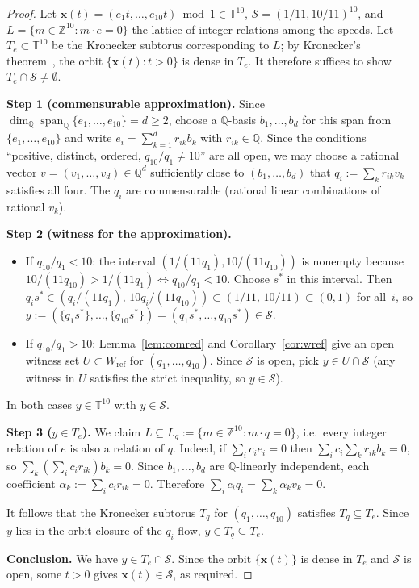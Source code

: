 \documentclass[12pt,a4paper]{amsart}
\theoremstyle{definition}
\theoremstyle{remark}
\newcommand{\Wref}{W_{\mathrm{ref}}}
\begin{document}
\begin{proof}
Let $\mathbf{x}(t)=(e_1t,\ldots,e_{10}t)\bmod 1\in\mathbb{T}^{10}$,
$\mathcal{S}=(1/11,10/11)^{10}$, and
$L=\{m\in\mathbb{Z}^{10}:m\cdot e=0\}$ the lattice of integer relations among the speeds.
Let $T_e\subset\mathbb{T}^{10}$ be the Kronecker subtorus corresponding to $L$; by
Kronecker's theorem~\cite{KN74}, the orbit $\{\mathbf{x}(t):t>0\}$ is dense in $T_e$.
It therefore suffices to show $T_e\cap\mathcal{S}\ne\emptyset$.

\medskip\noindent\textbf{Step 1 (commensurable approximation).}
Since $\dim_{\mathbb{Q}}\operatorname{span}_{\mathbb{Q}}\{e_1,\ldots,e_{10}\}=d\ge 2$,
choose a $\mathbb{Q}$-basis $b_1,\ldots,b_d$ for this span from $\{e_1,\ldots,e_{10}\}$
and write $e_i=\sum_{k=1}^d r_{ik}b_k$ with $r_{ik}\in\mathbb{Q}$.
Since the conditions ``positive, distinct, ordered, $q_{10}/q_1\ne 10$'' are all open,
we may choose a rational vector $v=(v_1,\ldots,v_d)\in\mathbb{Q}^d$ sufficiently close
to $(b_1,\ldots,b_d)$ that $q_i:=\sum_k r_{ik}v_k$ satisfies all four. The $q_i$ are
commensurable (rational linear combinations of rational $v_k$).

\medskip\noindent\textbf{Step 2 (witness for the approximation).}
\begin{itemize}
\item If $q_{10}/q_1<10$: the interval $(1/(11q_1),10/(11q_{10}))$ is nonempty because
  $10/(11q_{10})>1/(11q_1)\iff q_{10}/q_1<10$. Choose $s^*$ in this interval. Then
  $q_is^*\in(q_i/(11q_1),\,10q_i/(11q_{10}))\subset(1/11,\,10/11)\subset(0,1)$ for
  all~$i$, so $y:=(\{q_1s^*\},\ldots,\{q_{10}s^*\})=(q_1s^*,\ldots,q_{10}s^*)\in\mathcal{S}$.
\item If $q_{10}/q_1>10$: Lemma~\ref{lem:comred} and Corollary~\ref{cor:wref} give an
  open witness set $U\subset\Wref$ for $(q_1,\ldots,q_{10})$. Since $\mathcal{S}$ is open,
  pick $y\in U\cap\mathcal{S}$ (any witness in $U$ satisfies the strict inequality, so
  $y\in\mathcal{S}$).
\end{itemize}
In both cases $y\in\mathbb{T}^{10}$ with $y\in\mathcal{S}$.

\medskip\noindent\textbf{Step 3 ($y\in T_e$).}
We claim $L\subseteq L_q:=\{m\in\mathbb{Z}^{10}:m\cdot q=0\}$, i.e.\ every integer
relation of $e$ is also a relation of $q$. Indeed, if $\sum_i c_ie_i=0$ then
$\sum_i c_i\sum_k r_{ik}b_k=0$, so $\sum_k(\sum_i c_ir_{ik})b_k=0$. Since
$b_1,\ldots,b_d$ are $\mathbb{Q}$-linearly independent, each coefficient
$\alpha_k:=\sum_i c_ir_{ik}=0$. Therefore $\sum_i c_iq_i=\sum_k\alpha_kv_k=0$. \checkmark

It follows that the Kronecker subtorus $T_q$ for $(q_1,\ldots,q_{10})$ satisfies
$T_q\subseteq T_e$. Since $y$ lies in the orbit closure of the $q_i$-flow, $y\in T_q
\subseteq T_e$.

\medskip\noindent\textbf{Conclusion.}
We have $y\in T_e\cap\mathcal{S}$. Since the orbit $\{\mathbf{x}(t)\}$ is dense in $T_e$
and $\mathcal{S}$ is open, some $t>0$ gives $\mathbf{x}(t)\in\mathcal{S}$, as required.
\end{proof}
\end{document}
